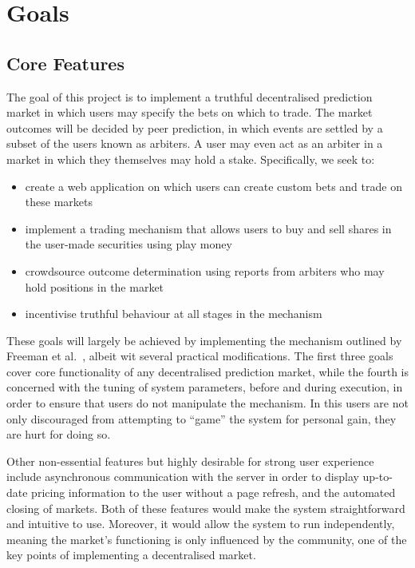 \section{Goals}

\label{sec:goals}

\subsection{Core Features}

The goal of this project is to implement a truthful decentralised prediction
market in which users may specify the bets on which to trade. The market
outcomes will be decided by peer prediction, in which events are settled by a
subset of the users known as arbiters. A user may even act as an arbiter in a
market in which they themselves may hold a stake. Specifically, we seek to:

\begin{itemize}
	\item create a web application on which users can create custom bets and
		trade on these markets
	\item implement a trading mechanism that allows users to buy and sell
		shares in the user-made securities using play money
	\item crowdsource outcome determination using reports from arbiters who may
		hold positions in the market
	\item incentivise truthful behaviour at all stages in the mechanism
\end{itemize}

These goals will largely be achieved by implementing the mechanism outlined by
Freeman et al.~\cite{Freeman2017}, albeit wit several practical modifications.
The first three goals cover core functionality of any decentralised prediction
market, while the fourth is concerned with the tuning of system parameters,
before and during execution, in order to ensure that users do not manipulate
the mechanism. In this users are not only discouraged from attempting to
``game'' the system for personal gain, they are hurt for doing so.

Other non-essential features but highly desirable for strong user experience
include asynchronous communication with the server in order to display
up-to-date pricing information to the user without a page refresh, and the
automated closing of markets. Both of these features would make the system
straightforward and intuitive to use. Moreover, it would allow the system to
run independently, meaning the market's functioning is only influenced by the
community, one of the key points of implementing a decentralised market.

